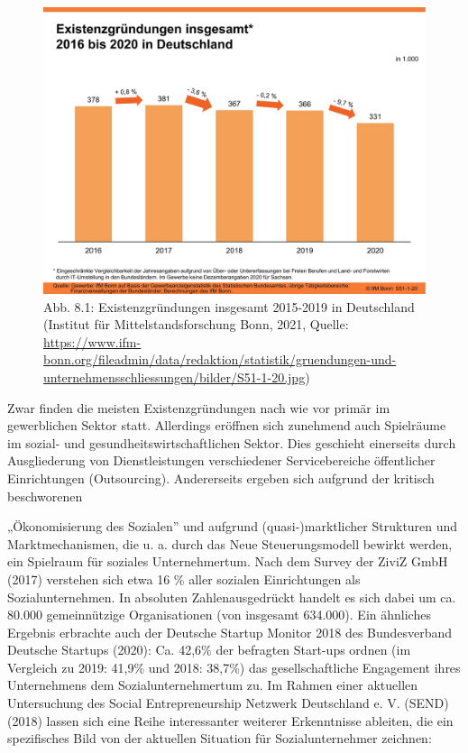 \documentclass[
  letterpaper,
]{book}
\begin{document}
\begin{figure}

\includegraphics[width=0.75\linewidth,height=\textheight,keepaspectratio]{images/figure81.jpeg} \hfill{}

\caption{Abb. 8.1: Existenzgründungen insgesamt 2015-2019 in Deutschland
(Institut für Mittelstandsforschung Bonn, 2021, Quelle:
\url{https://www.ifm-bonn.org/fileadmin/data/redaktion/statistik/gruendungen-und-unternehmensschliessungen/bilder/S51-1-20.jpg})}

\end{figure}%

Zwar finden die meisten Existenzgründungen nach wie vor primär im
gewerblichen Sektor statt. Allerdings eröffnen sich zunehmend auch
Spielräume im sozial- und gesundheitswirtschaftlichen Sektor. Dies
geschieht einerseits durch Ausgliederung von Dienstleistungen
verschiedener Servicebereiche öffentlicher Einrichtungen (Outsourcing).
Andererseits ergeben sich aufgrund der kritisch beschworenen

„Ökonomisierung des Sozialen'' und aufgrund (quasi-)marktlicher
Strukturen und Marktmechanismen, die u. a. durch das Neue
Steuerungsmodell bewirkt werden, ein Spielraum für soziales
Unternehmertum. Nach dem Survey der ZiviZ GmbH (2017) verstehen sich
etwa 16 \% aller sozialen Einrichtungen als Sozialunternehmen. In
absoluten Zahlenausgedrückt handelt es sich dabei um ca. 80.000
gemeinnützige Organisationen (von insgesamt 634.000). Ein ähnliches
Ergebnis erbrachte auch der Deutsche Startup Monitor 2018 des
Bundesverband Deutsche Startups (2020): Ca. 42,6\% der befragten
Start-ups ordnen (im Vergleich zu 2019: 41,9\% und 2018: 38,7\%) das
gesellschaftliche Engagement ihres Unternehmens dem Sozialunternehmertum
zu. Im Rahmen einer aktuellen Untersuchung des Social Entrepreneurship
Netzwerk Deutschland e. V. (SEND) (2018) lassen sich eine Reihe
interessanter weiterer Erkenntnisse ableiten, die ein spezifisches Bild
von der aktuellen Situation für Sozialunternehmer zeichnen:
\end{document}
